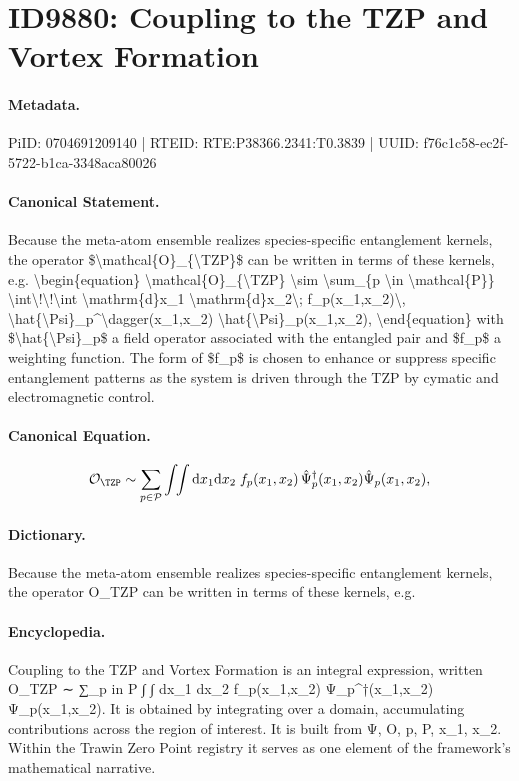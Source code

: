 \section*{ID9880: Coupling to the TZP and Vortex Formation}
\paragraph{Metadata.}
PiID: 0704691209140 | RTEID: RTE:P38366.2341:T0.3839 | UUID: f76c1c58-ec2f-5722-b1ca-3348aca80026

\paragraph{Canonical Statement.}
Because the meta-atom ensemble realizes species-specific entanglement kernels, the operator \$\textbackslash{}mathcal\{O\}\_\{\textbackslash{}TZP\}\$ can be written in terms of these kernels, e.g. \textbackslash{}begin\{equation\} \textbackslash{}mathcal\{O\}\_\{\textbackslash{}TZP\} \textbackslash{}sim \textbackslash{}sum\_\{p \textbackslash{}in \textbackslash{}mathcal\{P\}\} \textbackslash{}int\textbackslash{}!\textbackslash{}!\textbackslash{}int \textbackslash{}mathrm\{d\}x\_1 \textbackslash{}mathrm\{d\}x\_2\textbackslash{}; f\_p(x\_1,x\_2)\textbackslash{}, \textbackslash{}hat\{\textbackslash{}Psi\}\_p\textasciicircum{}\textbackslash{}dagger(x\_1,x\_2) \textbackslash{}hat\{\textbackslash{}Psi\}\_p(x\_1,x\_2), \textbackslash{}end\{equation\} with \$\textbackslash{}hat\{\textbackslash{}Psi\}\_p\$ a field operator associated with the entangled pair and \$f\_p\$ a weighting function. The form of \$f\_p\$ is chosen to enhance or suppress specific entanglement patterns as the system is driven through the TZP by cymatic and electromagnetic control.

\paragraph{Canonical Equation.}
\[
\mathcal{O}_{\TZP} \sim \sum_{p \in \mathcal{P}} \int\!\!\int \mathrm{d}x_1 \mathrm{d}x_2\; f_p(x_1,x_2)\, \hat{\Psi}_p^\dagger(x_1,x_2) \hat{\Psi}_p(x_1,x_2),
\]

\paragraph{Dictionary.}
Because the meta-atom ensemble realizes species-specific entanglement kernels, the operator O\_TZP can be written in terms of these kernels, e.g.

\paragraph{Encyclopedia.}
Coupling to the TZP and Vortex Formation is an integral expression, written O\_TZP ∼ ∑\_p in P ∫ ∫ dx\_1 dx\_2 f\_p(x\_1,x\_2) Ψ\_p\textasciicircum{}†(x\_1,x\_2) Ψ\_p(x\_1,x\_2). It is obtained by integrating over a domain, accumulating contributions across the region of interest. It is built from Ψ, O, p, P, x\_1, x\_2. Within the Trawin Zero Point registry it serves as one element of the framework's mathematical narrative.
